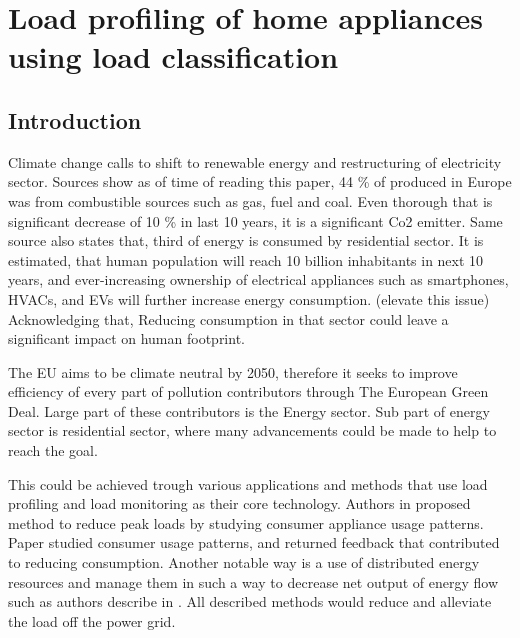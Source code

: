 \documentclass[
11pt, %
english, %
singlespacing, %
headsepline, %
]{MastersDoctoralThesis} %
\begin{document}


\chapter{Load profiling of home appliances using load classification}

\section{Introduction}
Climate change calls to shift to renewable energy and restructuring of electricity sector.
Sources \cite{eurostat2020} show as of time of reading this paper, 44 \% of produced in Europe was from combustible sources such as gas, fuel and coal. Even 
thorough that is significant decrease of 10 \% in last 10 years, it is a significant Co2 emitter.
Same source \cite{eurostat2020} also states that, third of energy is consumed by residential sector. It is estimated, 
that human population will reach 10 billion inhabitants in next 10 years, and ever-increasing ownership of electrical appliances such as smartphones, HVACs, and EVs will further increase energy consumption. (elevate this issue)
Acknowledging that, Reducing consumption in that sector could leave a significant impact on human footprint. 


The EU aims to be climate neutral by 2050, therefore it seeks to improve efficiency of every part of pollution contributors through The European Green Deal.
Large part of these contributors is the Energy sector.
Sub part of energy sector is residential sector, where many advancements could be made to help to reach the goal.  

This could be achieved trough various applications and methods that use load profiling and load monitoring as their core technology.
Authors in \cite{Chuan2014} proposed method to reduce peak loads by studying consumer
appliance usage patterns. Paper \cite{Csoknyai2019} studied consumer usage patterns, and returned feedback that contributed to reducing consumption.
Another notable way is a use of distributed energy resources and manage them in such a way to decrease net output of energy flow such as authors describe in
\cite{MORENOJARAMILLO2021445}. All described methods would reduce and alleviate the load off the power grid.
\end{document}
